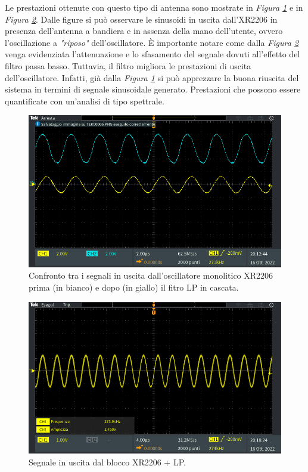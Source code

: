 \documentclass[titlepage]{report}
\begin{document}
	Le prestazioni ottenute con questo tipo di antenna sono mostrate in \textit{Figura \ref{fig:SINxr+LP}} e in \textit{Figura \ref{fig:SINx}}. Dalle figure si può osservare le sinusoidi in uscita dall'XR2206 in presenza dell'antenna a bandiera e in assenza della mano dell'utente, ovvero l'oscillazione a \textit{"riposo"} dell'oscillatore. È importante notare come dalla \textit{Figura \ref{fig:SINx}} venga evidenziata l'attenuazione e lo sfasamento del segnale dovuti all'effetto del filtro passa basso. Tuttavia, il filtro migliora le prestazioni di uscita dell'oscillatore. Infatti, già dalla \textit{Figura \ref{fig:SINxr+LP}} si può apprezzare la buona riuscita del sistema in termini di segnale sinusoidale generato. Prestazioni che possono essere quantificate con un'analisi di tipo spettrale.

	\begin{figure}[H]
		\centering
		\includegraphics[scale=0.5]{Immagini/sin_xr+lp.PNG}
		\caption{Confronto tra i segnali in uscita dall'oscillatore monolitico XR2206 prima (in bianco) e dopo (in giallo) il fitro LP in cascata.}
		\label{fig:SINxr+LP}
	\end{figure}


	\begin{figure}[H]
		\centering
		\includegraphics[scale=0.5]{Immagini/sin_xr.PNG}
		\caption{Segnale in uscita dal blocco XR2206 + LP.}
		\label{fig:SINx}
	\end{figure}
\end{document}
